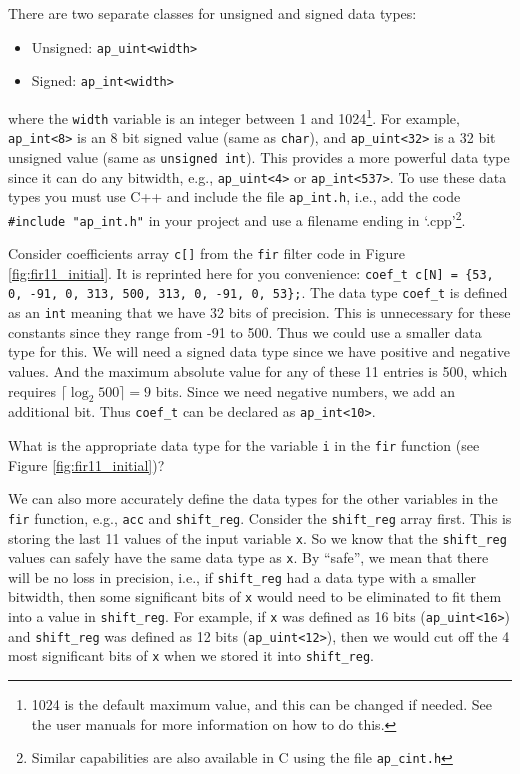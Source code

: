 There are two separate classes for unsigned and signed data types:
\begin{itemize}
\item Unsigned: \lstinline{ap_uint<width>}
\item Signed: \lstinline{ap_int<width>}
\end{itemize}
where the \lstinline{width} variable is an integer between 1 and 1024\footnote{1024 is the default maximum value, and this can be changed if needed. See the \VHLS user manuals for more information on how to do this.}.  For example, \lstinline{ap_int<8>} is an 8 bit signed value (same as \lstinline{char}), and \lstinline{ap_uint<32>} is a 32 bit unsigned value (same as \lstinline{unsigned int}). This provides a more powerful data type since it can do any bitwidth, e.g., \lstinline{ap_uint<4>} or \lstinline{ap_int<537>}. To use these data types you must use C++ and include the file \lstinline{ap_int.h}, i.e., add the code \lstinline{#include "ap_int.h"} in your project and use a filename ending in `.cpp'\footnote{Similar capabilities are also available in C using the file \lstinline{ap_cint.h}}.

Consider coefficients array \lstinline{c[]} from the \lstinline{fir} filter code in Figure \ref{fig:fir11_initial}. It is reprinted here for you convenience: \lstinline|coef_t c[N] = {53, 0, -91, 0, 313, 500, 313, 0, -91, 0, 53};|. The data type \lstinline{coef_t} is defined as an \lstinline{int} meaning that we have 32 bits of precision. This is unnecessary for these constants since they range from -91 to 500. Thus we could use a smaller data type for this. We will need a signed data type since we have positive and negative values. And the maximum absolute value for any of these 11 entries is 500, which requires $\lceil \log_2 500 \rceil = 9$ bits. Since we need negative numbers, we add an additional bit. Thus \lstinline{coef_t} can be declared as \lstinline{ap_int<10>}.

\begin{exercise}
What is the appropriate data type for the variable \lstinline{i} in the \lstinline{fir} function (see Figure \ref{fig:fir11_initial})?
\end{exercise}

We can also more accurately define the data types for the other variables in the \lstinline{fir} function, e.g., \lstinline{acc} and \lstinline{shift_reg}. Consider the \lstinline{shift_reg} array first. This is storing the last 11 values of the input variable \lstinline{x}. So we know that the \lstinline{shift_reg} values can safely have the same data type as \lstinline{x}. By ``safe'', we mean that there will be no loss in precision, i.e., if \lstinline{shift_reg} had a data type with a smaller bitwidth, then some significant bits of \lstinline{x} would need to be eliminated to fit them into a value in \lstinline{shift_reg}. For example, if \lstinline{x} was defined as 16 bits (\lstinline{ap_uint<16>}) and \lstinline{shift_reg} was defined as 12 bits (\lstinline{ap_uint<12>}), then we would cut off the 4 most significant bits of \lstinline{x} when we stored it into \lstinline{shift_reg}. 

